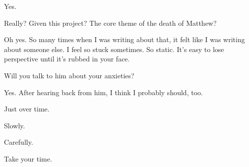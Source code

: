 Yes.

\begin{ally}
  Really? Given this project? The core theme of the death of Matthew?
\end{ally}

Oh yes. So many times when I was writing about that, it felt like I was writing about someone else. I feel so stuck sometimes. So static. It's easy to lose perspective until it's rubbed in your face.

\begin{ally}
  Will you talk to him about your anxieties?
\end{ally}

Yes. After hearing back from him, I think I probably should, too.

Just over time.

Slowly.

Carefully.

\begin{ally}
  Take your time.
\end{ally}
